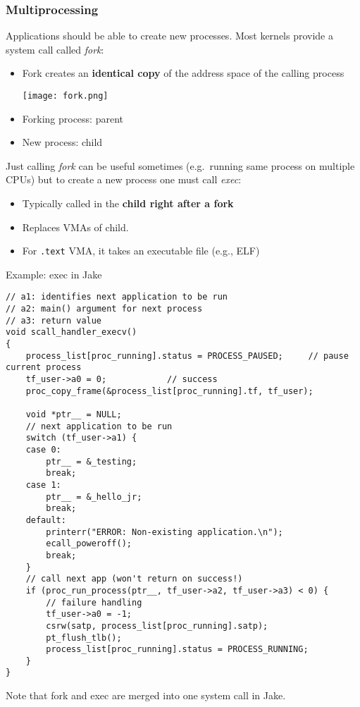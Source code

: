 \subsubsection{Multiprocessing}
Applications should be able to create new processes. Most kernels provide a system call called \textit{fork}:

\begin{itemize}
    \item Fork creates an \textbf{identical copy} of the address space of the calling process
    \begin{center}
        \texttt{[image: fork.png]}
    \end{center}
    \item Forking process: parent
    \item New process: child
\end{itemize}
Just calling \textit{fork} can be useful sometimes (e.g.\ running same process on multiple CPUs) but to create a new process one must call \textit{exec}:

\begin{itemize}
    \item Typically called in the \textbf{child right after a fork}
    \item Replaces VMAs of child. 
    \item For \texttt{.text} VMA, it takes an executable file (e.g., ELF)
\end{itemize}
Example: exec in Jake
\begin{lstlisting}[style=bright_C++]
// a1: identifies next application to be run
// a2: main() argument for next process
// a3: return value
void scall_handler_execv()
{
    process_list[proc_running].status = PROCESS_PAUSED;     // pause current process
    tf_user->a0 = 0;            // success                                    
    proc_copy_frame(&process_list[proc_running].tf, tf_user);

    void *ptr__ = NULL;
    // next application to be run
    switch (tf_user->a1) {
    case 0:
        ptr__ = &_testing;
        break;
    case 1:
        ptr__ = &_hello_jr;
        break;
    default:
        printerr("ERROR: Non-existing application.\n");
        ecall_poweroff();
        break;
    }
    // call next app (won't return on success!)
    if (proc_run_process(ptr__, tf_user->a2, tf_user->a3) < 0) {
        // failure handling
        tf_user->a0 = -1;
        csrw(satp, process_list[proc_running].satp);
        pt_flush_tlb();
        process_list[proc_running].status = PROCESS_RUNNING;
    }
}
\end{lstlisting}
Note that fork and exec are merged into one system call in Jake.

